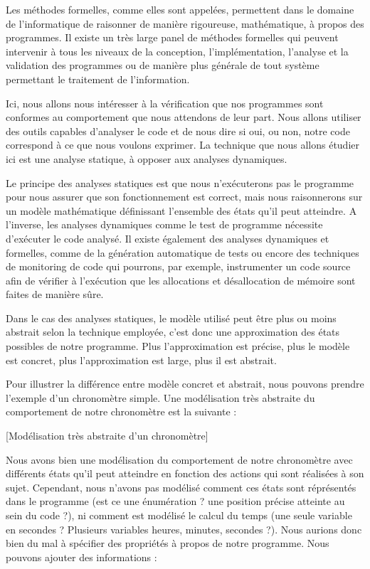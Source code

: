 

Les méthodes formelles, comme elles sont appelées, permettent dans le domaine de 
l'informatique de raisonner de manière rigoureuse, mathématique, à propos des 
programmes. Il existe un très large panel de méthodes formelles qui peuvent 
intervenir à tous les niveaux de la conception, l'implémentation, l'analyse et
la validation des programmes ou de manière plus générale de tout système
permettant le traitement de l'information.



Ici, nous allons nous intéresser à la vérification que nos programmes sont 
conformes au comportement que nous attendons de leur part. Nous allons utiliser 
des outils capables d'analyser le code et de nous dire si oui, ou non, notre 
code correspond à ce que nous voulons exprimer. La technique que nous allons 
étudier ici est une analyse statique, à opposer aux analyses dynamiques.



Le principe des analyses statiques est que nous n'exécuterons pas le programme 
pour nous assurer que son fonctionnement est correct, mais nous raisonnerons sur 
un modèle mathématique définissant l'ensemble des états qu'il peut atteindre.
A l'inverse, les analyses dynamiques comme le test de programme nécessite 
d'exécuter le code analysé. Il existe également des analyses dynamiques et 
formelles, comme de la génération automatique de tests ou encore des techniques de
monitoring de code qui pourrons, par exemple, instrumenter un code source afin de
vérifier à l'exécution que les allocations et désallocation de mémoire sont faites
de manière sûre.



Dans le cas des analyses statiques, le modèle utilisé peut être plus ou moins 
abstrait selon la technique employée, c'est donc une approximation des états 
possibles de notre programme. Plus l'approximation est précise, plus le modèle est
concret, plus l'approximation est large, plus il est abstrait.



Pour illustrer la différence entre modèle concret et abstrait, nous pouvons 
prendre l'exemple d'un chronomètre simple. Une modélisation très abstraite du
comportement de notre chronomètre est la suivante :



[Modélisation très abstraite d'un chronomètre]


Nous avons bien une modélisation du comportement de notre chronomètre avec 
différents états qu'il peut atteindre en fonction des actions qui sont réalisées
à son sujet. Cependant, nous n'avons pas modélisé comment ces états sont 
réprésentés dans le programme (est ce une énumération ? une position précise 
atteinte au sein du code ?), ni comment est modélisé le calcul du temps (une seule
variable en secondes ? Plusieurs variables heures, minutes, secondes ?). Nous 
aurions donc bien du mal à spécifier des propriétés à propos de notre programme. 
Nous pouvons ajouter des informations :



